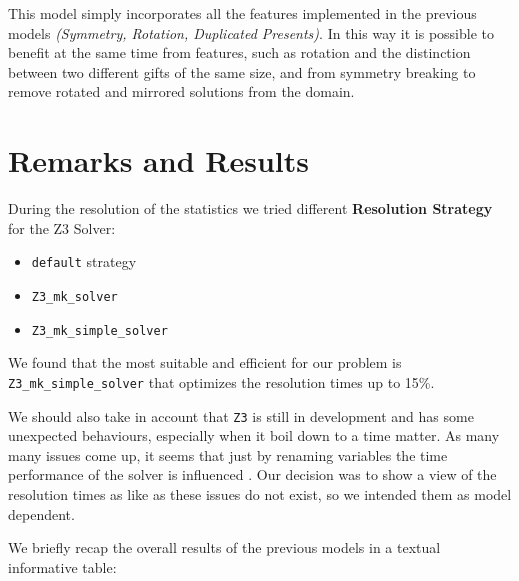 This model simply incorporates all the features implemented in the previous models \textit{(Symmetry, Rotation, Duplicated Presents)}.
In this way it is possible to benefit at the same time from features, such as rotation and the distinction between two different gifts of the same size,
and from symmetry breaking to remove rotated and mirrored solutions from the domain.  




\newpage
\section{Remarks and Results}
During the resolution of the statistics we tried different \textbf{Resolution Strategy} for the Z3 Solver:
\begin{itemize}
	\item \texttt{default} strategy
	\item \texttt{Z3\_mk\_solver}
	\item \texttt{Z3\_mk\_simple\_solver}
\end{itemize}
We found that the most suitable and efficient for our problem is \texttt{Z3\_mk\_simple\_solver} that optimizes the resolution times up to 15\%.

We should also take in account that \texttt{Z3} is still in development and has some unexpected behaviours, especially when it boil down to a time matter.
As many many issues come up, it seems that just by renaming variables the time performance of the solver is influenced \cite{z3issues}.
Our decision was to show a view of the resolution times as like as these issues do not exist, so we intended them as model dependent.

We briefly recap the overall results of the previous models in a textual informative table:

